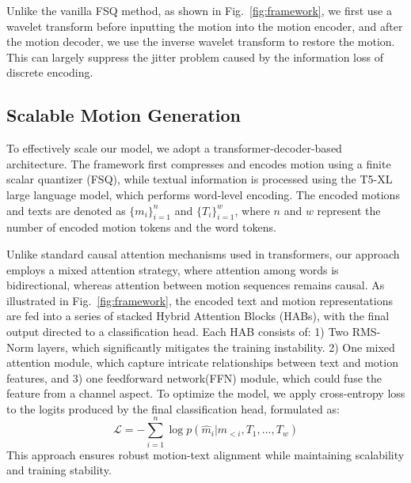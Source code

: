 Unlike the vanilla FSQ method, as shown in Fig.~\ref{fig:framework}, we first use a wavelet transform before inputting the motion into the motion encoder, and after the motion decoder, we use the inverse wavelet transform to restore the motion. This can largely suppress the jitter problem caused by the information loss of discrete encoding.

\subsection{Scalable Motion Generation}
To effectively scale our model, we adopt a transformer-decoder-based architecture. The framework first compresses and encodes motion using a finite scalar quantizer (FSQ), while textual information is processed using the T5-XL large language model, which performs word-level encoding. The encoded motions and texts are denoted as $\{m_i\}_{i=1}^{n}$ and $\{T_i\}_{i=1}^{w}$, where $n$ and $w$ represent the number of encoded motion tokens and the word tokens.

Unlike standard causal attention mechanisms used in transformers, our approach employs a mixed attention strategy, where attention among words is bidirectional, whereas attention between motion sequences remains causal. As illustrated in Fig.~\ref{fig:framework}, the encoded text and motion representations are fed into a series of stacked Hybrid Attention Blocks (HABs), with the final output directed to a classification head. Each HAB consists of:
1) Two RMS-Norm layers, which significantly mitigates the training instability. 2) One mixed attention module, which capture intricate relationships between text and motion features, and 3) one feedforward network(FFN) module, which could fuse the feature from a channel aspect. To optimize the model, we apply cross-entropy loss to the logits produced by the final classification head, formulated as:
\begin{equation}
    \mathcal{L} = - \sum_{i=1}^{n} \log p(\hat{m}_i | m_{<i}, T_1,...,T_w)
\end{equation}
This approach ensures robust motion-text alignment while maintaining scalability and training stability.
